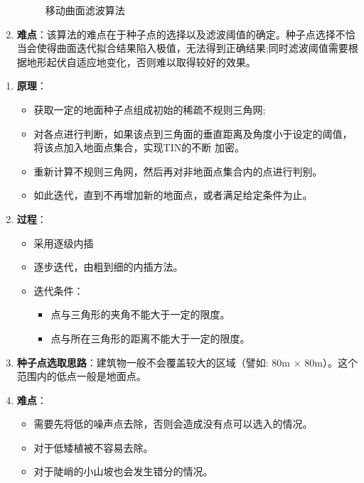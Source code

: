 \begin{enumerate}
\begin{figure}[htbp]
			\caption{移动曲面滤波算法}
			\label{fig:移动曲面滤波算法}
		\end{figure}
	\item \textbf{难点}：该算法的难点在于种子点的选择以及滤波阈值的确定。种子点选择不恰当会使得曲面迭代拟合结果陷入极值，无法得到正确结果;同时滤波阈值需要根据地形起伏自适应地变化，否则难以取得较好的效果。
\end{enumerate}

\begin{enumerate}
	\item \textbf{原理}：
		\begin{itemize}
			\item 获取一定的地面种子点组成初始的稀疏不规则三角网;
			\item 对各点进行判断，如果该点到三角面的垂直距离及角度小于设定的阈值，将该点加入地面点集合，实现TIN的不断 加密。
			\item 重新计算不规则三角网，然后再对非地面点集合内的点进行判别。
			\item 如此迭代，直到不再增加新的地面点，或者满足给定条件为止。
		\end{itemize}
	\item \textbf{过程}：
		\begin{itemize}
			\item 采用逐级内插
			\item 逐步迭代，由粗到细的内插方法。
			\item 迭代条件：
				\begin{itemize}
					\item 点与三角形的夹角不能大于一定的限度。
					\item 点与所在三角形的距离不能大于一定的限度。
				\end{itemize}
		\end{itemize}
	\item \textbf{种子点选取思路}：建筑物一般不会覆盖较大的区域（譬如: 80m × 80m）。这个范围内的低点一般是地面点。
	\item \textbf{难点}：
		\begin{itemize}
			\item 需要先将低的噪声点去除，否则会造成没有点可以选入的情况。
			\item 对于低矮植被不容易去除。
			\item 对于陡峭的小山坡也会发生错分的情况。
		\end{itemize}
\end{enumerate}

